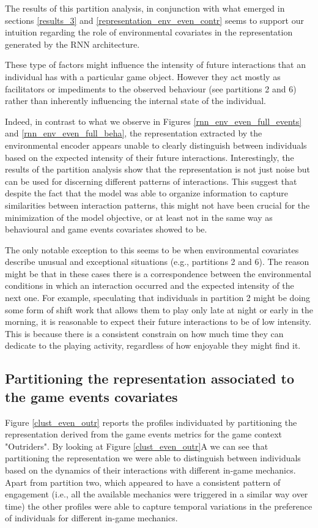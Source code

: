 The results of this partition analysis, in conjunction with what emerged in sections \ref{results_3} and \ref{representation_env_even_contr} seems to support our intuition regarding the role of environmental covariates in the representation generated by the RNN architecture. 

These type of factors might influence the intensity of future interactions that an individual has with a particular game object. However they act mostly as facilitators or impediments to the observed behaviour (see partitions 2 and 6) rather than inherently influencing the internal state of the individual. 

Indeed, in contrast to what we observe in Figures \ref{rnn_env_even_full_events} and \ref{rnn_env_even_full_beha}, the representation extracted by the environmental encoder appears unable to clearly distinguish between individuals based on the expected intensity of their future interactions. Interestingly, the results of the partition analysis show that the representation is not just noise but can be used for discerning different patterns of interactions. This suggest that despite the fact that the model was able to organize information to capture similarities between interaction patterns, this might not have been crucial for the minimization of the model objective, or at least not in the same way as behavioural and game events covariates showed to be.

The only notable exception to this seems to be when environmental covariates describe unusual and exceptional situations (e.g., partitions 2 and 6). The reason might be that in these cases there is a correspondence between the environmental conditions in which an interaction occurred and the expected intensity of the next one. For example, speculating that individuals in partition 2 might be doing some form of shift work that allows them to play only late at night or early in the morning, it is reasonable to expect their future interactions to be of low intensity. This is because there is a consistent constrain on how much time they can dedicate to the playing activity, regardless of how enjoyable they might find it.

\subsection{Partitioning the representation associated to the game events covariates}
Figure \ref{clust_even_outr} reports the profiles individuated by partitioning the representation derived from the game events metrics for the game context "Outriders". By looking at Figure \ref{clust_even_outr}A we can see that partitioning the representation we  were able to distinguish between individuals based on the dynamics of their interactions with different in-game mechanics. Apart from partition two, which appeared to have a consistent pattern of engagement (i.e., all the available mechanics were triggered in a similar way over time) the other profiles were able to capture temporal variations in the preference of individuals for different in-game mechanics.


